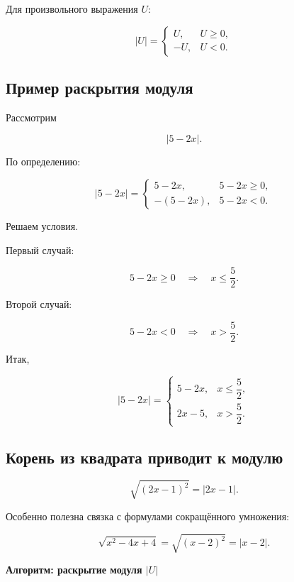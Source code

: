 \documentclass[a4paper,12pt]{article}
\begin{document}
Для произвольного выражения $U$:

\[
|U|=
\begin{cases}
U, & U\ge0,\\
-U, & U<0.
\end{cases}
\]

\subsection{Пример раскрытия модуля}

Рассмотрим

\[
|5-2x|.
\]

По определению:

\[
|5-2x|=
\begin{cases}
5-2x, & 5-2x\ge0,\\
-(5-2x), & 5-2x<0.
\end{cases}
\]

Решаем условия.

Первый случай:

\[
5-2x\ge0
\quad\Longrightarrow\quad
x\le\frac52.
\]

Второй случай:

\[
5-2x<0
\quad\Longrightarrow\quad
x>\frac52.
\]

Итак,

\[
|5-2x|=
\begin{cases}
5-2x, & x\le\dfrac52,\\
2x-5, & x>\dfrac52.
\end{cases}
\]

\subsection{Корень из квадрата приводит к модулю}

\[
\sqrt{(2x-1)^2}
=
|2x-1|.
\]

Особенно полезна связка с формулами сокращённого умножения:

\[
\sqrt{x^2-4x+4}
=
\sqrt{(x-2)^2}
=
|x-2|.
\]


\clearpage
\thispagestyle{empty}

\begin{center}
{\Large\bfseries\color{darkaccent}
Алгоритм: раскрытие модуля $|U|$}
\end{center}

\vspace{1cm}
\end{document}
